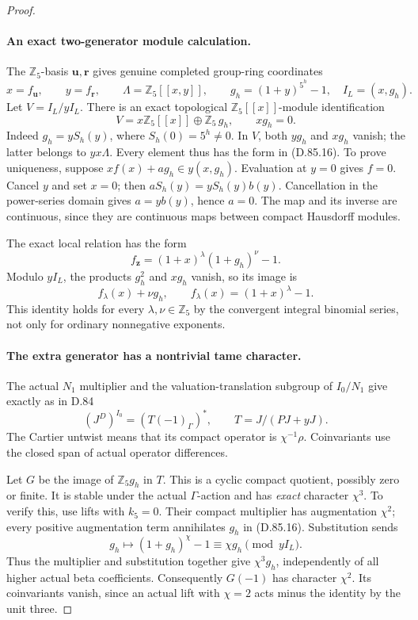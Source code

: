 \begin{proof}
\paragraph{An exact two-generator module calculation.}
The \(\mathbb Z_5\)-basis \(\mathbf u,\mathbf r\) gives
genuine completed group-ring coordinates
\[
 x=f_{\mathbf u},\qquad y=f_{\mathbf r},\qquad
 \Lambda=\mathbb Z_5[[x,y]],\qquad
 g_h=(1+y)^{5^h}-1,
 \quad I_L=(x,g_h).
                                                               \tag{D.85.15}
\]
Let \(V=I_L/yI_L\). There is an exact topological
\(\mathbb Z_5[[x]]\)-module identification
\[
 V=x\mathbb Z_5[[x]]\oplus\mathbb Z_5\,g_h,
 \qquad xg_h=0.
                                                               \tag{D.85.16}
\]
Indeed \(g_h=yS_h(y)\), where \(S_h(0)=5^h\ne0\).
In \(V\), both \(yg_h\) and \(xg_h\) vanish; the latter
belongs to \(yx\Lambda\). Every element thus has the
form in (D.85.16). To prove uniqueness, suppose
\(xf(x)+a g_h\in y(x,g_h)\). Evaluation at \(y=0\)
gives \(f=0\). Cancel \(y\) and set \(x=0\); then
\(aS_h(y)=yS_h(y)b(y)\). Cancellation in the power-series
domain gives \(a=yb(y)\), hence \(a=0\). The map and its
inverse are continuous, since they are continuous maps
between compact Hausdorff modules.

The exact local relation has the form
\[
 f_{\mathbf z}=(1+x)^\lambda(1+g_h)^\nu-1.
                                                               \tag{D.85.17}
\]
Modulo \(yI_L\), the products \(g_h^2\) and \(xg_h\)
vanish, so its image is
\[
                 f_\lambda(x)+\nu g_h,
 \qquad f_\lambda(x)=(1+x)^\lambda-1.
                                                               \tag{D.85.18}
\]
This identity holds for every \(\lambda,\nu\in\mathbb Z_5\)
by the convergent integral binomial series, not only for
ordinary nonnegative exponents.

\paragraph{The extra generator has a nontrivial tame character.}
The actual \(N_1\) multiplier and the valuation-translation
subgroup of \(I_0/N_1\) give exactly as in D.84
\[
 (J^D)^{I_0}=(T(-1)_\Gamma)^*,
 \qquad T=J/(PJ+yJ).
                                                               \tag{D.85.19}
\]
The Cartier untwist means that its compact operator is
\(\chi^{-1}\rho\). Coinvariants use the closed span of
actual operator differences.

Let \(G\) be the image of \(\mathbb Z_5g_h\) in \(T\).
This is a cyclic compact quotient, possibly zero or finite.
It is stable under the actual \(\Gamma\)-action and has
\emph{exact} character \(\chi^3\). To verify this, use
lifts with \(k_5=0\). Their compact multiplier has
augmentation \(\chi^2\); every positive augmentation term
annihilates \(g_h\) in (D.85.16). Substitution sends
\[
 g_h\longmapsto (1+g_h)^\chi-1\equiv\chi g_h
                                      \pmod{yI_L}.
\]
Thus the multiplier and substitution together give
\(\chi^3g_h\), independently of all higher actual beta
coefficients. Consequently \(G(-1)\) has character
\(\chi^2\). Its coinvariants vanish, since an actual lift
with \(\chi=2\) acts minus the identity by the unit three.


\end{proof}
